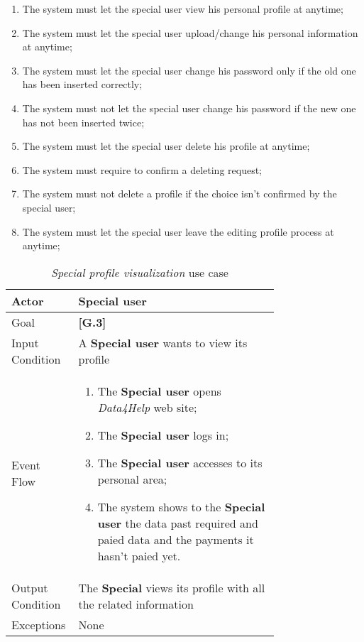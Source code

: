 \begin{enumerate}
  \item The system must let the special user view his personal profile at anytime;
  \item The system must let the special user upload/change his personal information at anytime;
  \item The system must let the special user change his password only if the old one has been inserted correctly;
  \item The system must not let the special user change his password if the new one has not been inserted twice;
  \item The system must let the special user delete his profile at anytime;
  \item The system must require to confirm a deleting request;
  \item The system must not delete a profile if the choice isn't confirmed by the special user;
  \item The system must let the special user leave the editing profile process at anytime;
\end{enumerate}

\begin{center}
\begin{table}
\begin{tabular}{ | l | p{0.75\linewidth} | }
  \hline
    Actor & \textbf{Special user} \\ \hline
    Goal & \textbf{[G.3]} \\ \hline
    Input Condition & A \textbf{Special user} wants to view its profile\\ \hline
    Event Flow & \begin{minipage}[t]{0.7\textwidth}
      \begin{enumerate}
        \item The \textbf{Special user } opens \textit{Data4Help} web site;
        \item The \textbf{Special user} logs in;
        \item The \textbf{Special user} accesses to its personal area;
        \item The system shows to the \textbf{Special user} the data past required and paied data and the payments it hasn't paied yet.
      \end{enumerate}
    \smallskip
  \end{minipage} \\ \hline
  Output Condition & The \textbf{Special} views its profile with all the related information\\ \hline
  Exceptions & None \\ \hline
\end{tabular}
\caption{\textit{Special profile visualization} use case}
\label{table:specialProfileVisualizationTable}
\end{table}
\end{center}
